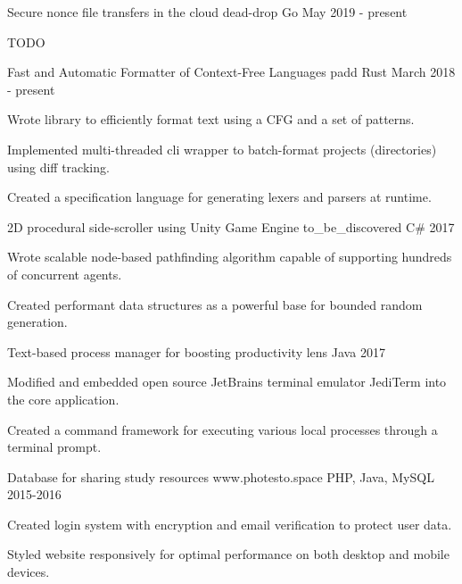 
\begin{cventries}

\cventry
    {Secure nonce file transfers in the cloud}
    {dead-drop}
    {Go}
    {May 2019 - present}
    {
      \begin{cvitems}
        \item TODO
      \end{cvitems}
    }

\cventry
    {Fast and Automatic Formatter of Context-Free Languages}
    {padd}
    {Rust}
    {March 2018 - present}
    {
      \begin{cvitems}
        \item Wrote library to efficiently format text using a CFG and a set of patterns.
        \item Implemented multi-threaded cli wrapper to batch-format projects (directories) using diff
        tracking.
        \item Created a specification language for generating lexers and parsers at runtime.
      \end{cvitems}
    }

\cventry
    {2D procedural side-scroller using Unity Game Engine}
    {to\_be\_discovered}
    {C\#}
    {2017}
    {
      \begin{cvitems}
        \item Wrote scalable node-based pathfinding algorithm capable of supporting hundreds of concurrent
        agents.
        \item Created performant data structures as a powerful base for bounded random generation.
      \end{cvitems}
    }

\cventry
    {Text-based process manager for boosting productivity}
    {lens}
    {Java}
    {2017}
    {
      \begin{cvitems}
        \item Modified and embedded open source JetBrains terminal emulator JediTerm into the core
        application.
        \item Created a command framework for executing various local processes through a terminal prompt.
      \end{cvitems}
    }

\cventry
    {Database for sharing study resources}
    {www.photesto.space}
    {PHP, Java, MySQL}
    {2015-2016}
    {
      \begin{cvitems}
        \item Created login system with encryption and email verification to protect user data.
        \item Styled website responsively for optimal performance on both desktop and mobile devices.
      \end{cvitems}
    }


\end{cventries}

